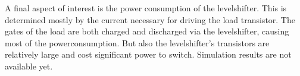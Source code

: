 A final aspect of interest is the power consumption of the levelshifter. This is determined mostly by the current necessary for driving the load transistor. The gates of the load are both charged and discharged via the levelshifter, causing most of the powerconsumption. But also the levelshifter's transistors are relatively large and cost significant power to switch. Simulation results are not available yet. 